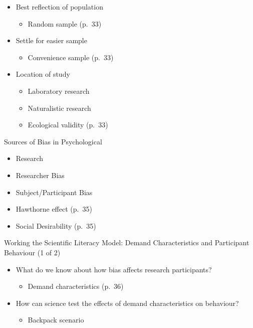 \documentclass[
]{book}
\providecommand{\tightlist}{%
  \setlength{\itemsep}{0pt}\setlength{\parskip}{0pt}}
\begin{document}
\begin{itemize}
\tightlist
\item
  Best reflection of population

  \begin{itemize}
  \tightlist
  \item
    Random sample (p.~33)\\
  \end{itemize}
\item
  Settle for easier sample

  \begin{itemize}
  \tightlist
  \item
    Convenience sample (p.~33)\\
  \end{itemize}
\item
  Location of study

  \begin{itemize}
  \tightlist
  \item
    Laboratory research\\
  \item
    Naturalistic research\\
  \item
    Ecological validity (p.~33)
  \end{itemize}
\end{itemize}

Sources of Bias in Psychological

\begin{itemize}
\tightlist
\item
  Research\\
\item
  Researcher Bias\\
\item
  Subject/Participant Bias\\
\item
  Hawthorne effect (p.~35)\\
\item
  Social Desirability (p.~35)
\end{itemize}

Working the Scientific Literacy Model: Demand Characteristics and
Participant Behaviour (1 of 2)

\begin{itemize}
\tightlist
\item
  What do we know about how bias affects research participants?

  \begin{itemize}
  \tightlist
  \item
    Demand characteristics (p.~36)\\
  \end{itemize}
\item
  How can science test the effects of demand characteristics on behaviour?

  \begin{itemize}
  \tightlist
  \item
    Backpack scenario
  \end{itemize}
\end{itemize}
\end{document}
